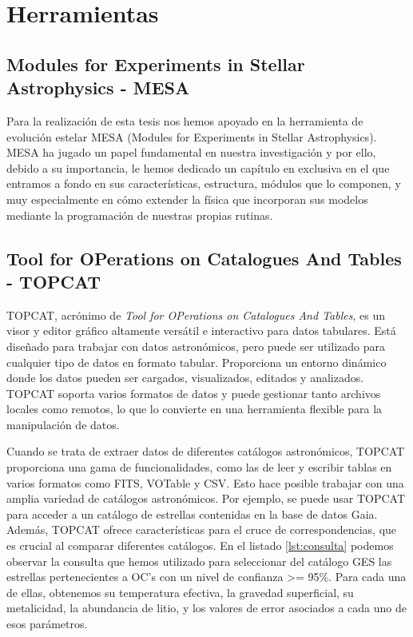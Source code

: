\section{Herramientas}
\subsection{Modules for Experiments in Stellar Astrophysics - MESA}
Para la realización de esta tesis nos hemos apoyado en la herramienta de evolución estelar MESA (Modules for Experiments in Stellar Astrophysics). MESA ha jugado un papel fundamental en nuestra investigación y por ello, debido a su importancia, le hemos dedicado un capítulo en exclusiva en el que entramos a fondo en sus características, estructura, módulos que lo componen, y muy especialmente en cómo extender la física que incorporan sus modelos mediante la programación de nuestras propias rutinas.\par

\subsection{Tool for OPerations on Catalogues And Tables - TOPCAT} \label{sec:tool_topcat}
TOPCAT, acrónimo de \textit{Tool for OPerations on Catalogues And Tables}, es un visor y editor gráfico altamente versátil e interactivo para datos tabulares. Está diseñado para trabajar con datos astronómicos, pero puede ser utilizado para cualquier tipo de datos en formato tabular. Proporciona un entorno dinámico donde los datos pueden ser cargados, visualizados, editados y analizados. TOPCAT soporta varios formatos de datos y puede gestionar tanto archivos locales como remotos, lo que lo convierte en una herramienta flexible para la manipulación de datos.\par

Cuando se trata de extraer datos de diferentes catálogos astronómicos, TOPCAT proporciona una gama de funcionalidades, como las de leer y escribir tablas en varios formatos como FITS, VOTable y CSV. Esto hace posible trabajar con una amplia variedad de catálogos astronómicos. Por ejemplo, se puede usar TOPCAT para acceder a un catálogo de estrellas contenidas en la base de datos Gaia. Además, TOPCAT ofrece características para el cruce de correspondencias, que es crucial al comparar diferentes catálogos. En el listado \ref{lst:consulta} podemos observar la consulta que hemos utilizado para seleccionar del catálogo GES las estrellas pertenecientes a OC's con un nivel de confianza >= 95\%. Para cada una de ellas, obtenemos su temperatura efectiva, la gravedad superficial, su metalicidad, la abundancia de litio, y los valores de error asociados a cada uno de esos parámetros.\par



